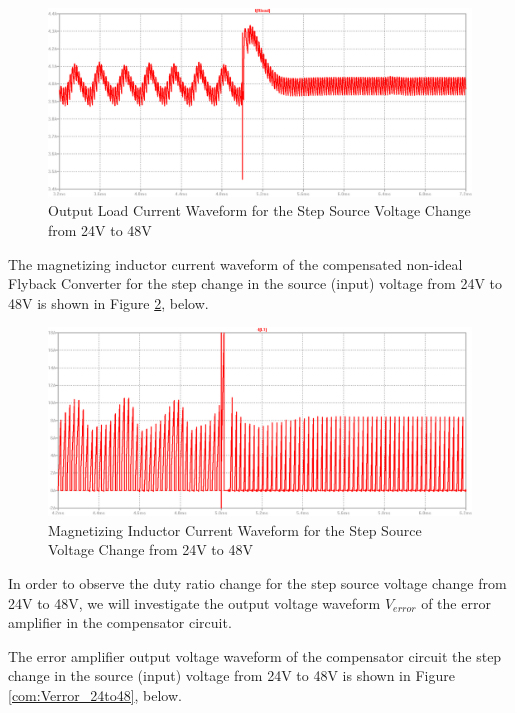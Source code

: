\begin{figure}[H]
\begin{center}
\includegraphics[width=1\textwidth]{comp_simulations/Iload_24to48.png}
\caption{Output Load Current Waveform for the Step Source Voltage Change from 24V to 48V}
\label{com:Iload_24to48}
\end{center}
\end{figure}

The magnetizing inductor current waveform of the compensated non-ideal Flyback Converter for the step change in the source (input) voltage from 24V to 48V is shown in Figure \ref{com:ILm_24to48}, below.

\begin{figure}[H]
\begin{center}
\includegraphics[width=1\textwidth]{comp_simulations/ILm_24to48.png}
\caption{Magnetizing Inductor Current Waveform for the Step Source Voltage Change from 24V to 48V}
\label{com:ILm_24to48}
\end{center}
\end{figure}

In order to observe the duty ratio change for the step source voltage change from 24V to 48V, we will investigate the output voltage waveform $V_{error}$ of the error amplifier in the compensator circuit.

The error amplifier output voltage waveform of the compensator circuit the step change in the source (input) voltage from 24V to 48V is shown in Figure \ref{com:Verror_24to48}, below.

